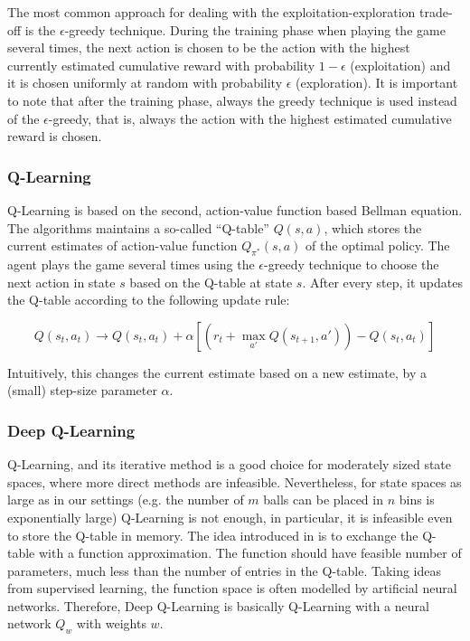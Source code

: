 The most common approach for dealing with the exploitation-exploration trade-off is the $\epsilon$-greedy technique. During the training phase when playing the game several times, the next action is chosen to be the action with the highest currently estimated cumulative reward with probability $1-\epsilon$ (exploitation) and it is chosen uniformly at random with probability $\epsilon$ (exploration). It is important to note that after the training phase, always the greedy technique is used instead of the $\epsilon$-greedy, that is, always the action with the highest estimated cumulative reward is chosen.



\subsubsection{Q-Learning}


Q-Learning \cite{watkins1989qlearning} is based on the second, action-value function based Bellman equation. The algorithms maintains a so-called ``Q-table'' $Q(s,a)$, which stores the current estimates of action-value function $Q_{\pi^*}(s,a)$ of the optimal policy. The agent plays the game several times using the $\epsilon$-greedy technique to choose the next action in state $s$ based on the Q-table at state $s$. After every step, it updates the Q-table according to the following update rule:

\begin{equation} \label{eq:q-learningUpdate}
Q(s_t,a_t) \longrightarrow Q(s_t,a_t) + \alpha[( r_t + \max_{a'} Q(s_{t+1}, a')) - Q(s_t,a_t)]
\end{equation}


Intuitively, this changes the current estimate based on a new estimate, by a (small) step-size parameter $\alpha$.


\subsubsection{Deep Q-Learning} \label{deepq-learning}


Q-Learning, and its iterative method is a good choice for moderately sized state spaces, where more direct methods are infeasible. Nevertheless, for state spaces as large as in our settings (e.g. the number of $m$ balls can be placed in $n$ bins is exponentially large) Q-Learning is not enough, in particular, it is infeasible even to store the Q-table in memory. The idea introduced in \cite{mnih2013DQN} is to exchange the Q-table with a function approximation. The function should have feasible number of parameters, much less than the number of entries in the Q-table. Taking ideas from supervised learning, the function space is often modelled by artificial neural networks. Therefore, Deep Q-Learning is basically Q-Learning with a neural network $Q_w$ with weights $w$.

